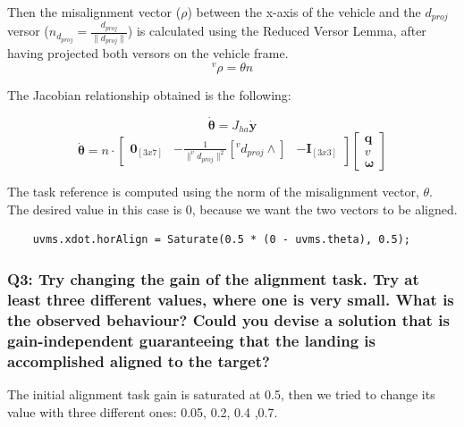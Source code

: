 \documentclass{article}
\begin{document}
Then the misalignment vector (\(\rho\)) between the x-axis of the vehicle and the \(d_{proj}\) versor (\(n_{d_{proj}}=\frac{d_{proj}}{\|d_{proj}\|}\)) is calculated using the Reduced Versor Lemma, after having projected both versors on the vehicle frame.
$$^v\rho = \theta n$$

The Jacobian relationship obtained is the following:

$$ \bm{\dot{\theta}} = J_{ha} \bm{\dot{y}}$$
$$ \bm{\dot{\theta}} = n \cdot \begin{bmatrix} \bm{0}_{[3x7]} & -\frac{1}{\|^vd_{proj}\|^2}[^vd_{proj}\wedge] & -\bm{I}_{[3x3]} \end{bmatrix} \begin{bmatrix} \bm{q}   \\ \bm{\textit{v}} \\ \bm{\omega} \end{bmatrix} $$

The task reference is computed using the norm of the misalignment vector, $\theta$. The desired value in this case is \(0\), because we want the two vectors to be aligned.

\begin{lstlisting}
	uvms.xdot.horAlign = Saturate(0.5 * (0 - uvms.theta), 0.5);
\end{lstlisting}

\subsubsection{Q3: Try changing the gain of the alignment task. Try at least three different values, where one is very small. What is the observed behaviour? Could you devise a solution that is gain-independent guaranteeing that the landing is accomplished aligned to the target?}
The initial alignment task gain is saturated at 0.5, then we tried to change its value with three different ones: 0.05, 0.2, 0.4 ,0.7.

\begin{figure}[H]
	\centering
	\hspace{10mm}
	\label{im:v_land_gain0_05}
\end{figure} 

\begin{figure}[H]
	\centering
	\hspace{10mm}
	\label{im:v_land_gain0_2}
\end{figure} 
\end{document}
